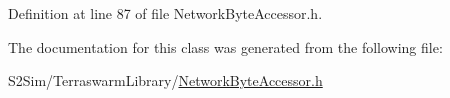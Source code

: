 Definition at line 87 of file Network\-Byte\-Accessor.\-h.



The documentation for this class was generated from the following file\-:\begin{DoxyCompactItemize}
\item 
S2\-Sim/\-Terraswarm\-Library/\hyperlink{_network_byte_accessor_8h}{Network\-Byte\-Accessor.\-h}\end{DoxyCompactItemize}
